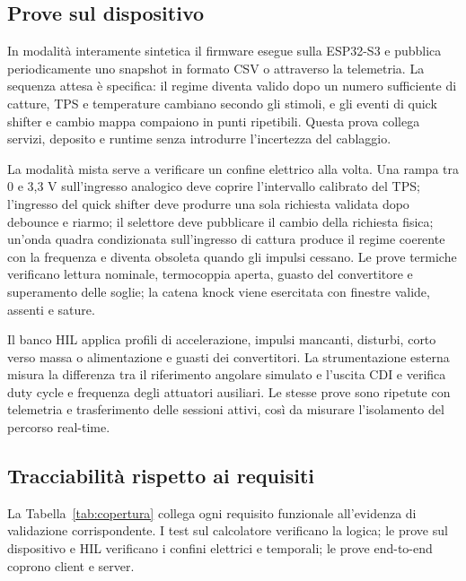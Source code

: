 \documentclass{article}
\begin{document}
\subsection{Prove sul dispositivo}

In modalità interamente sintetica il firmware esegue sulla ESP32-S3 e pubblica
periodicamente uno snapshot in formato CSV o attraverso la telemetria. La sequenza attesa è
specifica: il regime diventa valido dopo un numero sufficiente di catture, TPS e
temperature cambiano secondo gli stimoli, e gli eventi di quick shifter e cambio
mappa compaiono in punti ripetibili. Questa prova collega servizi, deposito e
runtime senza introdurre l'incertezza del cablaggio.

La modalità mista serve a verificare un confine elettrico alla volta. Una rampa
tra 0 e 3,3 V sull'ingresso analogico deve coprire l'intervallo calibrato del
TPS; l'ingresso del quick shifter deve produrre una sola richiesta validata
dopo debounce e riarmo; il selettore deve pubblicare il cambio della richiesta
fisica; un'onda quadra condizionata sull'ingresso di cattura produce il
regime coerente con la frequenza e diventa obsoleta quando gli impulsi
cessano. Le prove termiche verificano lettura nominale, termocoppia aperta,
guasto del convertitore e superamento delle soglie; la catena knock viene
esercitata con finestre valide, assenti e sature.

Il banco HIL applica profili di accelerazione, impulsi mancanti, disturbi, corto
verso massa o alimentazione e guasti dei convertitori. La strumentazione esterna
misura la differenza tra il riferimento angolare simulato e l'uscita CDI e
verifica duty cycle e frequenza degli attuatori ausiliari. Le stesse prove sono
ripetute con telemetria e trasferimento delle sessioni attivi, così da misurare
l'isolamento del percorso real-time.

\subsection{Tracciabilità rispetto ai requisiti}

La Tabella~\ref{tab:copertura} collega ogni requisito funzionale all'evidenza di
validazione corrispondente. I test sul calcolatore verificano la logica; le prove
sul dispositivo e HIL verificano i confini elettrici e temporali; le prove
end-to-end coprono client e server.
\end{document}
